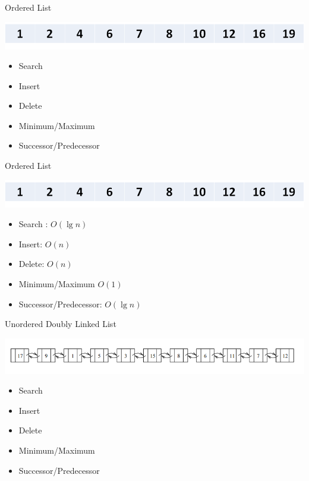 \documentclass{beamer}
\begin{document}
\begin{frame}{Ordered List}
\begin{center}
    \includegraphics[scale=0.4]{orderedList.png}
\end{center}
\begin{itemize}
    \item Search
    \item Insert
    \item Delete
    \item Minimum/Maximum
    \item Successor/Predecessor
\end{itemize}
\end{frame}


\begin{frame}{Ordered List}
\begin{center}
    \includegraphics[scale=0.4]{orderedList.png}
\end{center}
\begin{itemize}
    \item Search : $O(\lg n)$
    \item Insert: $O(n)$
    \item Delete: $O(n)$
    \item Minimum/Maximum $O(1)$
    \item Successor/Predecessor: $O(\lg n)$
\end{itemize}
\end{frame}



\begin{frame}{Unordered Doubly Linked List}
\begin{center}
    \includegraphics[scale=0.4]{linkedList.png}
\end{center}
\begin{itemize}
    \item Search
    \item Insert
    \item Delete
    \item Minimum/Maximum
    \item Successor/Predecessor
\end{itemize}
\end{frame}
\end{document}

